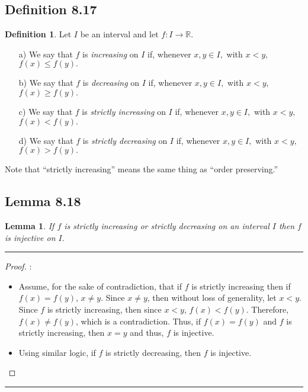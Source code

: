 \documentclass[openany, amssymb, psamsfonts]{amsart}
\newcommand{\bbR}{\mathbb{R}}
\newtheorem{lem}{Lemma}[section]
\theoremstyle{definition}
\newtheorem{defn}{Definition}[section]
\numberwithin{equation}{section}
\begin{document}
\subsection*{Definition 8.17}
\begin{defn}
\label{8.17}
Let $I$ be an interval and let $f:I\to\bbR.$ 
\begin{enumerate}
\item[a)] We say that $f$ is {\em increasing} on $I$ if, whenever $x,y\in I,$ with $x<y,$ $f(x)\leq f(y).$
\item[b)] We say that $f$ is {\em decreasing} on $I$  if, whenever $x,y\in I,$ with $x<y,$ $f(x)\geq f(y).$
\item[c)] We say that $f$ is {\em strictly increasing} on $I$ if, whenever $x,y\in I,$ with $x<y,$ $f(x)< f(y).$
\item[d)] We say that $f$ is {\em strictly decreasing} on $I$  if, whenever $x,y\in I,$ with $x<y,$ $f(x)> f(y).$
\end{enumerate}
\end{defn}




Note that ``strictly increasing'' means the same thing as ``order preserving.''

\subsection*{Lemma 8.18}
\begin{lem} If $f$ is strictly increasing or strictly decreasing on an interval $I$ then $f$ is injective on $I.$
\end{lem}
\vspace{4pt}     \hrule   \vspace{4pt} 
\begin{proof}:\\
\begin{itemize}
    \item Assume, for the sake of contradiction, that if $f$ is strictly increasing then if $f(x) = f(y)$, $x\neq y$. Since $x\neq y$, then without loss of generality, let $x<y$. Since $f$ is strictly increasing, then since $x<y$, $f(x)<f(y)$. Therefore, $f(x)\neq f(y)$, which is a contradiction. Thus, if $f(x) = f(y)$ and $f$ is strictly increasing, then $x = y$ and thus, $f$ is injective.
    \item Using similar logic, if $f$ is strictly decreasing, then $f$ is injective. 
\end{itemize}
\end{proof}\vspace{4pt}     \hrule   \vspace{4pt} 
\end{document}
